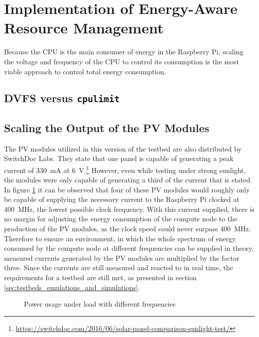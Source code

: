 \section{Implementation of Energy-Aware Resource Management}
\label{sec:implementation_of_energy-aware_resource_management}

Because the CPU is the main consumer of energy in the Raspberry Pi, scaling the
voltage and frequency of the CPU to control its consumption is the most viable
approach to control total energy consumption.

\subsection{DVFS versus \texttt{cpulimit}}

\subsection{Scaling the Output of the PV Modules}

The PV modules utilized in this version of the testbed are also distributed by
SwitchDoc Labs. They state that one panel is capable of generating a peak
current of \mbox{330 mA} at \mbox{6
V}.\footnote{\url{https://switchdoc.com/2016/06/solar-panel-comparison-sunlight-test/}}
However, even while testing under strong sunlight, the modules were only capable
of generating a third of the current that is stated. In figure \ref{fig:load} it
can be observed that four of these PV modules would roughly only be capable of
supplying the necessary current to the Raspberry Pi clocked at \mbox{400 MHz},
the lowest possible clock frequency. With this current supplied, there is no
margin for adjusting the energy consumption of the compute node to the
production of the PV modules, as the clock speed could never surpass \mbox{400
MHz}. Therefore to ensure an environment, in which the whole spectrum of energy
consumed by the compute node at different frequencies can be supplied in theory,
measured currents generated by the PV modules are multiplied by the factor
three. Since the currents are still measured and reacted to in real time, the
requirements for a testbed are still met, as presented in section
\ref{sec:testbeds_emulations_and_simulations}.

\begin{figure}
    \centering
    
    \caption{Power usage under load with different frequencies}
    \label{fig:load}
\end{figure}

